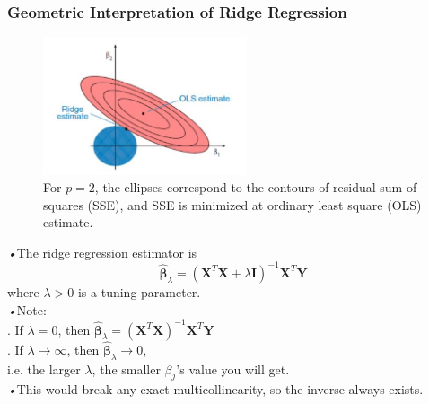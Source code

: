 \documentclass{beamer}
\begin{document}
	\begin{frame}
	\frametitle{Geometric Interpretation of Ridge Regression}
	\begin{figure}[h]
	\begin{center}
		\includegraphics[width=6cm]{image02}
	\end{center}
	\caption{For $p = 2$, the ellipses correspond to the contours of residual sum of squares (SSE), and SSE is minimized at ordinary least square (OLS) estimate.}
	\end{figure}
	\end{frame}

	\begin{frame}
	
	\emph{•}The ridge regression estimator is 
	\begin{equation*}
	\hat{\boldsymbol{\beta}}_{\lambda} = (\boldsymbol{X}^T\boldsymbol{X} + \lambda\boldsymbol{I}) ^{-1} \boldsymbol{X}^T \boldsymbol{Y} 
	\end{equation*}
	where $\lambda > 0$ is a tuning parameter.
	\\\emph{•}Note:
	\\. If $\lambda = 0$, then $\hat{\boldsymbol{\beta}}_{\lambda} = (\boldsymbol{X}^T\boldsymbol{X} ) ^{-1} \boldsymbol{X}^T \boldsymbol{Y} $  
	\\. If $\lambda \rightarrow \infty$, then $\hat{\boldsymbol{\beta}}_{\lambda} \rightarrow 0$, 
	\\\quad i.e. the larger $\lambda$, the smaller $\beta_j$'s value you will get.
	\\\emph{•}This would break any exact multicollinearity, so the inverse always exists.
	
	\end{frame}
	
\end{document}
